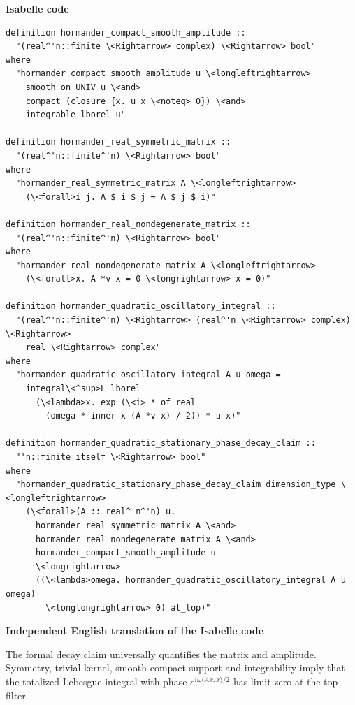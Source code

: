 \documentclass[10pt,oneside]{article}
\newcommand{\reviewlabel}[1]{\par\smallskip\noindent\textsf{\bfseries #1}\par\smallskip}
\begin{document}
\reviewlabel{Isabelle code}
\begin{lstlisting}
definition hormander_compact_smooth_amplitude ::
  "(real^'n::finite \<Rightarrow> complex) \<Rightarrow> bool"
where
  "hormander_compact_smooth_amplitude u \<longleftrightarrow>
    smooth_on UNIV u \<and>
    compact (closure {x. u x \<noteq> 0}) \<and>
    integrable lborel u"

definition hormander_real_symmetric_matrix ::
  "(real^'n::finite^'n) \<Rightarrow> bool"
where
  "hormander_real_symmetric_matrix A \<longleftrightarrow>
    (\<forall>i j. A $ i $ j = A $ j $ i)"

definition hormander_real_nondegenerate_matrix ::
  "(real^'n::finite^'n) \<Rightarrow> bool"
where
  "hormander_real_nondegenerate_matrix A \<longleftrightarrow>
    (\<forall>x. A *v x = 0 \<longrightarrow> x = 0)"

definition hormander_quadratic_oscillatory_integral ::
  "(real^'n::finite^'n) \<Rightarrow> (real^'n \<Rightarrow> complex) \<Rightarrow>
    real \<Rightarrow> complex"
where
  "hormander_quadratic_oscillatory_integral A u omega =
    integral\<^sup>L lborel
      (\<lambda>x. exp (\<i> * of_real
        (omega * inner x (A *v x) / 2)) * u x)"

definition hormander_quadratic_stationary_phase_decay_claim ::
  "'n::finite itself \<Rightarrow> bool"
where
  "hormander_quadratic_stationary_phase_decay_claim dimension_type \<longleftrightarrow>
    (\<forall>(A :: real^'n^'n) u.
      hormander_real_symmetric_matrix A \<and>
      hormander_real_nondegenerate_matrix A \<and>
      hormander_compact_smooth_amplitude u
      \<longrightarrow>
      ((\<lambda>omega. hormander_quadratic_oscillatory_integral A u omega)
        \<longlongrightarrow> 0) at_top)"
\end{lstlisting}

\reviewlabel{Independent English translation of the Isabelle code}
The formal decay claim universally quantifies the matrix and amplitude. Symmetry, trivial kernel, smooth compact support and integrability imply that the totalized Lebesgue integral with phase $e^{i\omega\langle Ax,x\rangle/2}$ has limit zero at the top filter.
\end{document}
